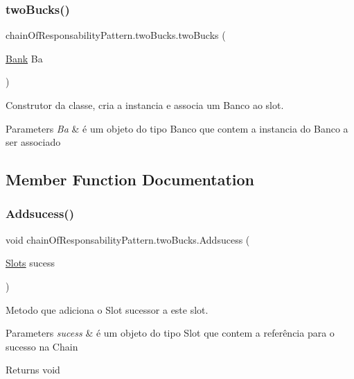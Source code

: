\subsubsection{\texorpdfstring{twoBucks()}{twoBucks()}}
{\footnotesize\ttfamily chain\+Of\+Responsability\+Pattern.\+two\+Bucks.\+two\+Bucks (\begin{DoxyParamCaption}\item[{\mbox{\hyperlink{classmediator_pattern_1_1_bank}{Bank}}}]{Ba }\end{DoxyParamCaption})}



Construtor da classe, cria a instancia e associa um Banco ao slot. 


\begin{DoxyParams}{Parameters}
{\em Ba} & é um objeto do tipo Banco que contem a instancia do Banco a ser associado \\
\hline
\end{DoxyParams}


\subsection{Member Function Documentation}
\mbox{\label{classchain_of_responsability_pattern_1_1two_bucks_aee4fde4f5cd634df654a5f384d4bc483}} 
\subsubsection{\texorpdfstring{Addsucess()}{Addsucess()}}
{\footnotesize\ttfamily void chain\+Of\+Responsability\+Pattern.\+two\+Bucks.\+Addsucess (\begin{DoxyParamCaption}\item[{\mbox{\hyperlink{interfacechain_of_responsability_pattern_1_1_slots}{Slots}}}]{sucess }\end{DoxyParamCaption})}



Metodo que adiciona o Slot sucessor a este slot. 


\begin{DoxyParams}{Parameters}
{\em sucess} & é um objeto do tipo Slot que contem a referência para o sucesso na Chain \\
\hline
\end{DoxyParams}
\begin{DoxyReturn}{Returns}
void 
\end{DoxyReturn}
\mbox{\label{classchain_of_responsability_pattern_1_1two_bucks_ac2c6c72c1e3d129c2e414f744196f547}} 
